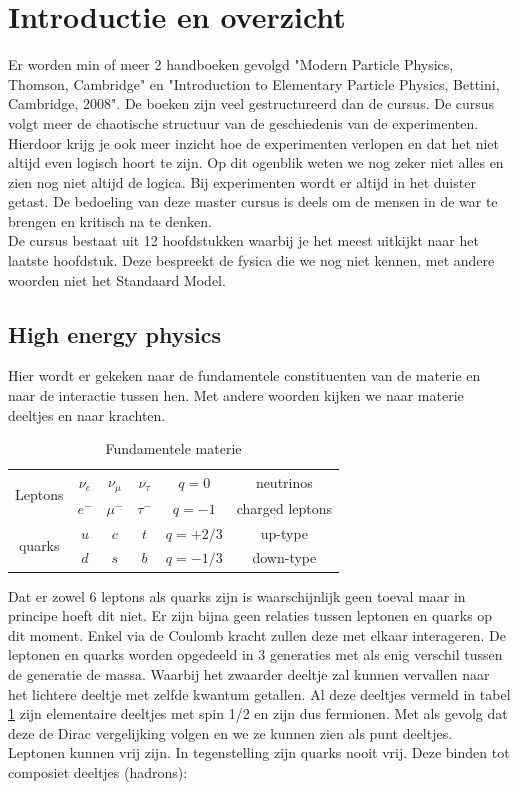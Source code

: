 \documentclass[../main.tex]{subfiles}
\begin{document}
\section{Introductie en overzicht}%
\label{sec:introductie_en_overzicht}

Er worden min of meer 2 handboeken gevolgd "Modern Particle Physics, Thomson, Cambridge" en "Introduction to Elementary Particle Physics,  Bettini, Cambridge, 2008". De boeken zijn veel gestructureerd dan de cursus. De cursus volgt meer de chaotische structuur van de geschiedenis van de experimenten. Hierdoor krijg je ook meer inzicht hoe de experimenten verlopen en dat het niet altijd even logisch hoort te zijn. Op dit ogenblik weten we nog zeker niet alles en zien nog niet altijd de logica. Bij experimenten wordt er altijd in het duister getast. De bedoeling van deze master cursus is deels om de mensen in de war te brengen en kritisch na te denken.\\
De cursus bestaat uit 12 hoofdstukken waarbij je het meest uitkijkt naar het laatste hoofdstuk. Deze bespreekt de fysica die we nog niet kennen, met andere woorden niet het Standaard Model.

\subsection{High energy physics}%
\label{sub:high_energy_physics}
Hier wordt er gekeken naar de fundamentele constituenten van de materie en naar de interactie tussen hen. Met andere woorden kijken we naar materie deeltjes en naar krachten.

\begin{table}[h]
    \centering
    \caption{Fundamentele materie}
    \label{tab:fund_mat}
    \begin{tabular}{cc|c|ccc}
        \multicolumn{1}{c}{\multirow{2}{*}{Leptons}} & $\nu_e$ & $\nu_\mu$ & $\nu_\tau$ & $q=0$ & neutrinos \\
        \multicolumn{1}{c}{}                         & $e^-$ & $\mu^-$ & $\tau^-$ & $q=-1$ & charged leptons \\ \hline
        \multirow{2}{*}{quarks}                      & $u$ & $c$ & $t$ & $q=+2/3$ & up-type \\
                                                     & $d$ & $s$ & $b$ & $q=-1/3$ & down-type
    \end{tabular}
\end{table}

Dat er zowel 6 leptons als quarks zijn is waarschijnlijk geen toeval maar in principe hoeft dit niet. Er zijn bijna geen relaties tussen leptonen en quarks op dit moment. Enkel via de Coulomb kracht zullen deze met elkaar interageren. De leptonen en quarks worden opgedeeld in 3 generaties met als enig verschil tussen de generatie de massa. Waarbij het zwaarder deeltje zal kunnen vervallen naar het lichtere deeltje met zelfde kwantum getallen. Al deze deeltjes vermeld in tabel \ref{tab:fund_mat} zijn elementaire deeltjes met spin 1/2 en zijn dus fermionen. Met als gevolg dat deze de Dirac vergelijking volgen en we ze kunnen zien als punt deeltjes.\\
Leptonen kunnen vrij zijn. In tegenstelling zijn quarks nooit vrij. Deze binden tot composiet deeltjes (hadrons):
\end{document}
